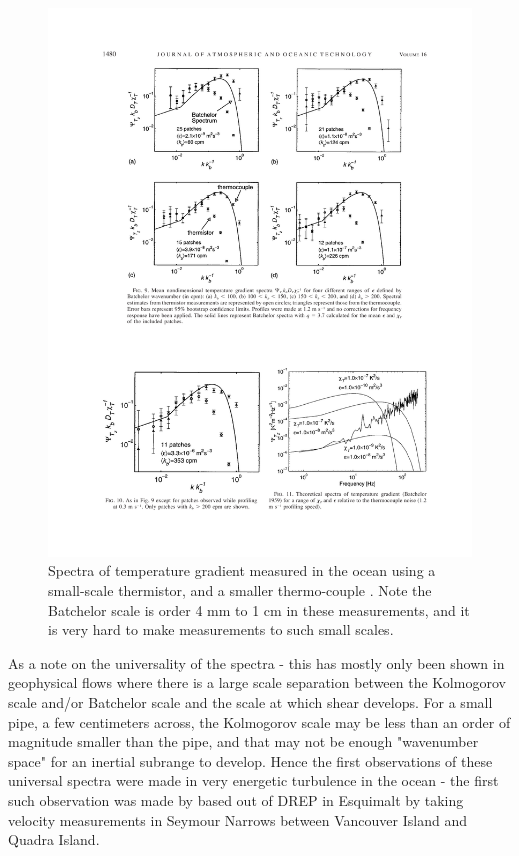 \documentclass[11pt]{article}
\begin{document}
\begin{figure}[hbtp]
  \begin{center}
    \includegraphics[width=5in]{images/NashEtAl99Fig9}
    \caption{Spectra of temperature gradient measured in the ocean using a
small-scale thermistor, and a smaller thermo-couple \citep{nashetal99}.  Note
the Batchelor scale is order 4 mm to 1 cm in these measurements, and it is very
hard to make measurements to such small scales.}   
    \label{fig:NashEtAl99Fig9}
  \end{center}
\end{figure}

As a note on the universality of the spectra - this has mostly only been shown
in geophysical flows where there is a large scale separation between the
Kolmogorov scale and/or Batchelor scale and the scale at which shear develops. 
For a small pipe, a few centimeters across, the Kolmogorov scale may be less
than an order of magnitude smaller than the pipe, and that may not be enough
"wavenumber space" for an inertial subrange to develop.  Hence the first
observations of these universal spectra were made in very energetic turbulence
in the ocean - the first such observation was made by \citet{grantetal62} based
out of DREP in Esquimalt by taking velocity measurements in Seymour Narrows
between Vancouver Island and Quadra Island.  
\end{document}
